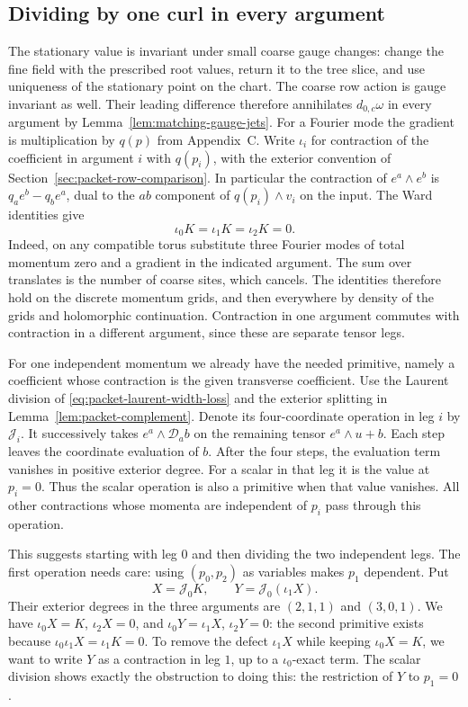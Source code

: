 \documentclass[11pt,reqno]{amsart}
\numberwithin{equation}{section}
\theoremstyle{definition}
\theoremstyle{remark}
\begin{document}
\subsection{Dividing by one curl in every argument}

The stationary value is invariant under small coarse gauge
changes: change the fine field with the prescribed root
values, return it to the tree slice, and use uniqueness of
the stationary point on the chart. The coarse row action
is gauge invariant as well. Their leading difference
therefore annihilates \(d_{0,c}\omega\) in every argument
by Lemma~\ref{lem:matching-gauge-jets}. For a Fourier
mode the gradient is multiplication by \(q(p)\) from
Appendix~C. Write \(\iota_i\) for contraction of the
coefficient in argument \(i\) with \(q(p_i)\), with the
exterior convention of Section~\ref{sec:packet-row-comparison}.
In particular the contraction of \(e^a\wedge e^b\) is
\(q_a e^b-q_b e^a\), dual to the \(ab\) component of
\(q(p_i)\wedge v_i\) on the input. The
Ward identities give
\[
                      \iota_0K=\iota_1K=\iota_2K=0 .
\]
Indeed, on any compatible torus substitute three Fourier
modes of total momentum zero and a gradient in the
indicated argument. The sum over translates is the number
of coarse sites, which cancels. The identities therefore
hold on the discrete momentum grids, and then everywhere
by density of the grids and holomorphic continuation.
Contraction in one argument commutes with contraction in
a different argument, since these are separate tensor legs.

For one independent momentum we already have the needed
primitive, namely a coefficient whose contraction is the
given transverse coefficient. Use the Laurent division of
\eqref{eq:packet-laurent-width-loss} and the exterior
splitting in Lemma~\ref{lem:packet-complement}. Denote
its four-coordinate operation in leg \(i\) by \(\mathcal J_i\).
It successively takes \(e^a\wedge\mathcal D_a b\) on the
remaining tensor \(e^a\wedge u+b\). Each step leaves the
coordinate evaluation of \(b\). After the four steps, the
evaluation term vanishes in positive exterior degree.
For a scalar in that leg it is the value at \(p_i=0\).
Thus the scalar operation is also a primitive when that
value vanishes. All other contractions whose momenta
are independent of \(p_i\) pass through this operation.

This suggests starting with leg \(0\) and then dividing the
two independent legs. The first operation needs care:
using \((p_0,p_2)\) as variables makes \(p_1\) dependent.
Put
\[
                     X=\mathcal J_0 K,\qquad
                     Y=\mathcal J_0(\iota_1 X).
\]
Their exterior degrees in the three arguments are
\((2,1,1)\) and \((3,0,1)\). We have
\(\iota_0X=K\), \(\iota_2X=0\), and
\(\iota_0Y=\iota_1X\), \(\iota_2Y=0\):
the second primitive exists because
\(\iota_0\iota_1X=\iota_1K=0\).
To remove the defect \(\iota_1X\) while keeping
\(\iota_0X=K\), we want to write \(Y\) as a contraction
in leg \(1\), up to a \(\iota_0\)-exact term. The scalar
division shows exactly the obstruction to doing this:
the restriction of \(Y\) to \(p_1=0\).
\end{document}
